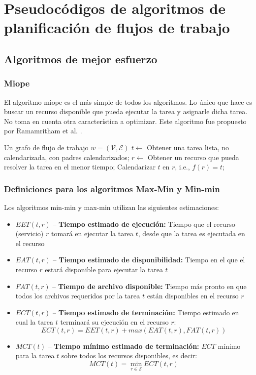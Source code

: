 \chapter{Pseudocódigos de algoritmos de planificación de flujos de trabajo}

\section{Algoritmos de mejor esfuerzo}
\subsection{Miope}
El algoritmo miope \cite{yu2008workflow} es el más simple de todos los algoritmos. Lo único que hace es buscar un recurso disponible que pueda ejecutar la tarea y asignarle dicha tarea. No toma en cuenta otra característica a optimizar. Este algoritmo fue propuesto por Ramamritham et al. \cite{ramamritham1990efficient}. 

\label{alg:myopic}
\begin{algorithmic}[1]
\Require Un grafo de flujo de trabajo $w=(\mathcal{V}, \mathcal{E})$
	\State $t \gets$ Obtener una tarea lista, no calendarizada, con padres calendarizados;
	\State $r \gets$ Obtener un recurso que pueda resolver la tarea en el menor tiempo;
	\State Calendarizar $t$ en $r$, i.e., $f(r) = t$;
\EndWhile
\end{algorithmic}

\subsection{Definiciones para los algoritmos Max-Min y Min-min}
Los algoritmos min-min y max-min utilizan las siguientes  estimaciones: %
\begin{itemize}
\item{$EET(t,r)$ -- \textbf{Tiempo estimado de ejecución:} Tiempo que el recurso (servicio) $r$ tomará en ejecutar la tarea $t$, desde que la tarea es ejecutada en el recurso}
\item{$EAT(t,r)$ -- \textbf{Tiempo estimado de disponibilidad:} Tiempo en el que el recurso $r$ estará disponible para ejecutar la tarea $t$}
\item{$FAT(t,r)$ -- \textbf{Tiempo de archivo disponible:} Tiempo más pronto en que todos los archivos requeridos por la tarea $t$ están disponibles en el recurso $r$}
\item{$ECT(t,r)$ -- \textbf{Tiempo estimado de terminación:} Tiempo estimado en cual la tarea $t$ terminará su ejecución en el recurso $r$: 
              \[ ECT(t,r) = EET(t,r) + max(EAT(t,r), FAT(t,r)) \]}
\item{$MCT(t)$ -- \textbf{Tiempo mínimo estimado de terminación: } $ECT$ mínimo para la tarea $t$ sobre todos los recursos disponibles, es decir: 
            \[ MCT(t) = \min_{r \in \mathcal{S}} ECT(t,r) \]}
\end{itemize}

